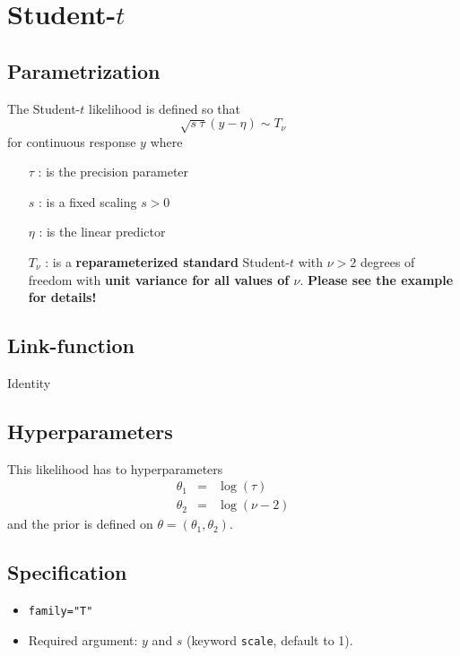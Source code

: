 \documentclass[a4paper,11pt]{article}
\begin{document}
\section*{Student-$t$}

\subsection*{Parametrization}

The Student-$t$ likelihood is defined so that 
\[
\sqrt{s\ \tau}(y - \eta)\sim T_{\nu}
\]
for continuous response $y$ where
\begin{itemize}
\item[$\tau$]: is the precision parameter
\item[$s$]: is a fixed scaling $s>0$
\item[$\eta$]: is the linear predictor
\item[$T_{\nu}$]: is a \textbf{reparameterized standard} Student-$t$
    with $\nu>2$ degrees of freedom with \textbf{unit variance for all
        values of $\nu$}. \textbf{Please see the example for details!}
\end{itemize}

\subsection*{Link-function}

Identity

\subsection*{Hyperparameters}

This likelihood has to hyperparameters
\begin{eqnarray*}
    \theta_1 &=& \log(\tau)\\
    \theta_2&=&\log(\nu-2)
\end{eqnarray*}
and the prior is defined on $\theta=(\theta_1,\theta_2)$. 

\subsection*{Specification}

\begin{itemize}
\item \texttt{family="T"}
\item Required argument: $y$ and $s$ (keyword {\tt scale}, default
    to 1).
\end{itemize}
\end{document}
